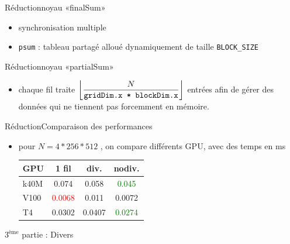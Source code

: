\documentclass[11pt,mathserif]{beamer}
\begin{document}
\begin{frame}{Réduction}{noyau «finalSum»}
\pause
  
\pause
  \begin{itemize}[<+->]
    \item synchronisation multiple
    \item {\tt psum} : tableau partagé alloué dynamiquement de taille {\tt BLOCK\_SIZE }
  \end{itemize}
\end{frame}

\begin{frame}{Réduction}{noyau «partialSum»}
\pause
  
\pause
  \begin{itemize}[<+->]
    \item chaque fil traite $\displaystyle \left\lfloor \frac{N}{\mbox{{\tt gridDim.x * blockDim.x}}}\right\rfloor $ entrées afin de gérer
    des données qui ne tiennent pas forcemment en mémoire.
  \end{itemize}
\end{frame}

\begin{frame}{Réduction}{Comparaison des performances}
  \begin{itemize}[<+->]
    \item[\faClockO] pour $N = 4*256*512$ , on compare différents GPU, avec des temps en ms
   \begin{center}
      \begin{tabular}{|l|c|c|c|}
    \hline
      GPU & 1 fil & div. & nodiv.   \\
    \hline
    k40M  & 0.074  & 0.058 & \textcolor{green}{0.045} \\
    V100  & \textcolor{red}{0.0068} & 0.011 & 0.0072 \\
    T4    & 0.0302 & 0.0407& \textcolor{green}{0.0274} \\
    \hline
    \end{tabular}
    \end{center}
  \end{itemize}
\end{frame}
\begin{frame}
  \begin{center}
    {\Huge $3^{\mbox{ème}}$ partie : Divers }
  \end{center}
\end{frame}
\end{document}
